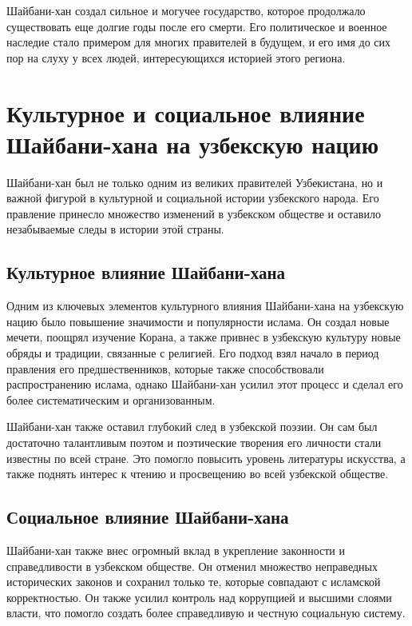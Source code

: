 \documentclass[draft]{article}
\begin{document}
Шайбани-хан создал сильное и могучее государство, которое продолжало существовать еще долгие годы после его смерти. Его политическое и военное наследие стало примером для многих правителей в будущем, и его имя до сих пор на слуху у всех людей, интересующихся историей этого региона.\newpage\section{Культурное и социальное влияние Шайбани-хана на узбекскую нацию}

Шайбани-хан был не только одним из великих правителей Узбекистана, но и важной фигурой в культурной и социальной истории узбекского народа. Его правление принесло множество изменений в узбекском обществе и оставило незабываемые следы в истории этой страны.

\subsection{Культурное влияние Шайбани-хана}

Одним из ключевых элементов культурного влияния Шайбани-хана на узбекскую нацию было повышение значимости и популярности ислама. Он создал новые мечети, поощрял изучение Корана, а также привнес в узбекскую культуру новые обряды и традиции, связанные с религией. Его подход взял начало в период правления его предшественников, которые также способствовали распространению ислама, однако Шайбани-хан усилил этот процесс и сделал его более систематическим и организованным.

Шайбани-хан также оставил глубокий след в узбекской поэзии. Он сам был достаточно талантливым поэтом и поэтические творения его личности стали известны по всей стране. Это помогло повысить уровень литературы искусства, а также поднять интерес к чтению и просвещению во всей узбекской обществе.

\subsection{Социальное влияние Шайбани-хана}

Шайбани-хан также внес огромный вклад в укрепление законности и справедливости в узбекском обществе. Он отменил множество неправедных исторических законов и сохранил только те, которые совпадают с исламской корректностью. Он также усилил контроль над коррупцией и высшими слоями власти, что помогло создать более справедливую и честную социальную систему.
\end{document}
